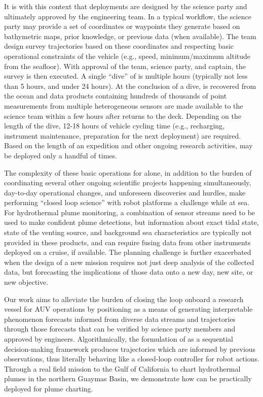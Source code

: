 It is with this context that \Sentry deployments are designed by the science party and ultimately approved by the \Sentry engineering team. In a typical workflow, the science party may provide a set of coordinates or waypoints they generate based on bathymetric maps, prior knowledge, or previous data (when available). The \Sentry team design survey trajectories based on these coordinates and respecting basic operational constraints of the vehicle (e.g., speed, minimum/maximum altitude from the seafloor). With approval of the \Sentry team, science party, and captain, the survey is then executed. A single ``dive'' of \Sentry is multiple hours (typically not less than 5 hours, and under 24 hours). At the conclusion of a dive, \Sentry is recovered from the ocean and data products containing hundreds of thousands of point measurements from multiple heterogeneous sensors are made available to the science team within a few hours after \Sentry returns to the deck. Depending on the length of the dive, 12-18 hours of vehicle cycling time (e.g., recharging, instrument maintenance, preparation for the next deployment) are required. Based on the length of an expedition and other ongoing research activities, \Sentry may be deployed only a handful of times.

The complexity of these basic operations for \Sentry alone, in addition to the burden of coordinating several other ongoing scientific projects happening simultaneously, day-to-day operational changes, and unforeseen discoveries and hurdles, make performing ``closed loop science'' with robot platforms a challenge while at sea. For hydrothermal plume monitoring, a combination of sensor streams need to be used to make confident plume detections\autocite{jakuba2007stochastic}, but information about exact tidal state, state of the venting source, and background sea characteristics are typically not provided in these products, and can require fusing data from other instruments deployed on a cruise, if available. The planning challenge is further exacerbated when the design of a new mission requires not just deep analysis of the collected data, but forecasting the implications of those data onto a new day, new site, or new objective. 

Our work aims to alleviate the burden of closing the loop onboard a research vessel for AUV operations by positioning \PHORTEX as a means of generating interpretable phenomenon forecasts informed from diverse data streams and trajectories through those forecasts that can be verified by science party members and approved by \Sentry engineers. Algorithmically, the formulation of \PHORTEX as a sequential decision-making framework produces trajectories which are informed by previous observations, thus literally behaving like a closed-loop controller for robot actions. Through a real field mission to the Gulf of California to chart hydrothermal plumes in the northern Guaymas Basin, we demonstrate how \PHORTEX can be practically deployed for plume charting.

